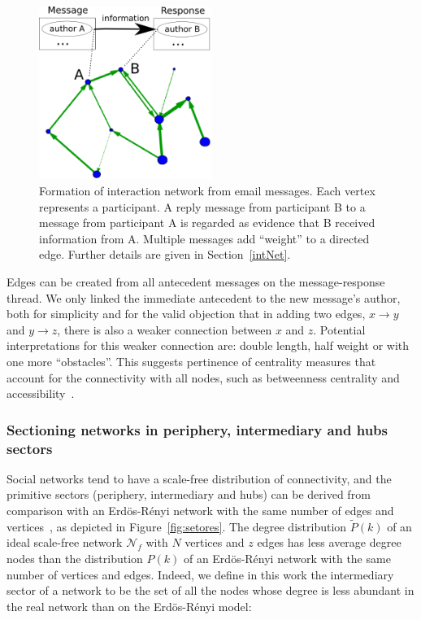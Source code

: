 \documentclass[%
 aip,
 jmp,%
 amsmath,amssymb,
 reprint,%
]{revtex4-1}
\begin{document}
\begin{figure}[hb]
    \centering
    \includegraphics[width=0.5\textwidth]{figs/criaRede_}
    \caption{Formation of interaction network from email messages. Each vertex represents a participant. A reply message from participant B to a message from participant A is regarded as evidence that B received information from A. Multiple messages add ``weight'' to a directed edge. Further details are given in Section~\ref{intNet}.}
    \label{formationNetwork}
\end{figure}


Edges can be created from all antecedent messages on the message-response thread. We only linked the immediate antecedent to the new message's author, both for simplicity and for the valid objection that in adding two edges, $x\rightarrow y$ and $y\rightarrow z$, there is also a weaker connection between $x$ and $z$. Potential interpretations for this weaker connection are: double length, half weight or with one more ``obstacles''. This suggests pertinence of centrality measures that account for the connectivity with all nodes, such as betweenness centrality and accessibility~\cite{luMeasures,access}.


        \subsubsection{Sectioning networks in periphery, intermediary and hubs sectors}\label{sectioning}


Social networks tend to have a scale-free distribution of connectivity, and the primitive sectors (periphery, intermediary and hubs) can be derived from comparison with an Erd\"os-R\'enyi  network with the same number of edges and vertices~\cite{3setores}, as depicted in Figure~\ref{fig:setores}.
The degree distribution $\widetilde{P}(k)$ of an ideal
scale-free network $\mathcal{N}_f$ with $N$ vertices and $z$ edges has less
average degree nodes than the distribution $P(k)$ of an Erd\"os-R\'enyi
network with the same number of vertices and edges. Indeed, we define in this work the intermediary sector of a network to be the set of all the nodes whose degree is less abundant in the real network than on the Erd\"os-R\'enyi model:
\end{document}
